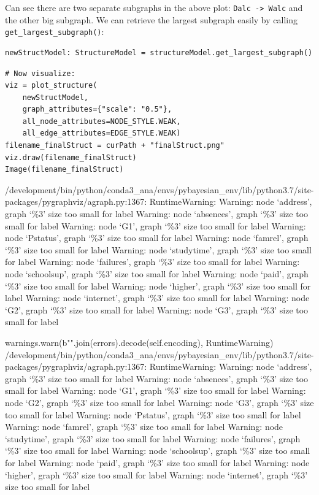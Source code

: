 \documentclass[
]{article}
\begin{document}
Can see there are two separate subgraphs in the above plot:
\texttt{Dalc -> Walc} and the other big subgraph. We can
retrieve the largest subgraph easily by calling
\texttt{get_largest_subgraph()}:

\begin{verbatim}
newStructModel: StructureModel = structureModel.get_largest_subgraph()
\end{verbatim}

\begin{verbatim}
# Now visualize:
viz = plot_structure(
    newStructModel,
    graph_attributes={"scale": "0.5"},
    all_node_attributes=NODE_STYLE.WEAK,
    all_edge_attributes=EDGE_STYLE.WEAK)
filename_finalStruct = curPath + "finalStruct.png"
viz.draw(filename_finalStruct)
Image(filename_finalStruct)
\end{verbatim}

/development/bin/python/conda3\_ana/envs/pybayesian\_env/lib/python3.7/site-packages/pygraphviz/agraph.py:1367:
RuntimeWarning: Warning: node `address', graph `\%3' size too small for
label Warning: node `absences', graph `\%3' size too small for label
Warning: node `G1', graph `\%3' size too small for label Warning: node
`Pstatus', graph `\%3' size too small for label Warning: node `famrel',
graph `\%3' size too small for label Warning: node `studytime', graph
`\%3' size too small for label Warning: node `failures', graph `\%3'
size too small for label Warning: node `schoolsup', graph `\%3' size too
small for label Warning: node `paid', graph `\%3' size too small for
label Warning: node `higher', graph `\%3' size too small for label
Warning: node `internet', graph `\%3' size too small for label Warning:
node `G2', graph `\%3' size too small for label Warning: node `G3',
graph `\%3' size too small for label

warnings.warn(b"".join(errors).decode(self.encoding), RuntimeWarning)
/development/bin/python/conda3\_ana/envs/pybayesian\_env/lib/python3.7/site-packages/pygraphviz/agraph.py:1367:
RuntimeWarning: Warning: node `address', graph `\%3' size too small for
label Warning: node `absences', graph `\%3' size too small for label
Warning: node `G1', graph `\%3' size too small for label Warning: node
`G2', graph `\%3' size too small for label Warning: node `G3', graph
`\%3' size too small for label Warning: node `Pstatus', graph `\%3' size
too small for label Warning: node `famrel', graph `\%3' size too small
for label Warning: node `studytime', graph `\%3' size too small for
label Warning: node `failures', graph `\%3' size too small for label
Warning: node `schoolsup', graph `\%3' size too small for label Warning:
node `paid', graph `\%3' size too small for label Warning: node
`higher', graph `\%3' size too small for label Warning: node `internet',
graph `\%3' size too small for label
\end{document}
